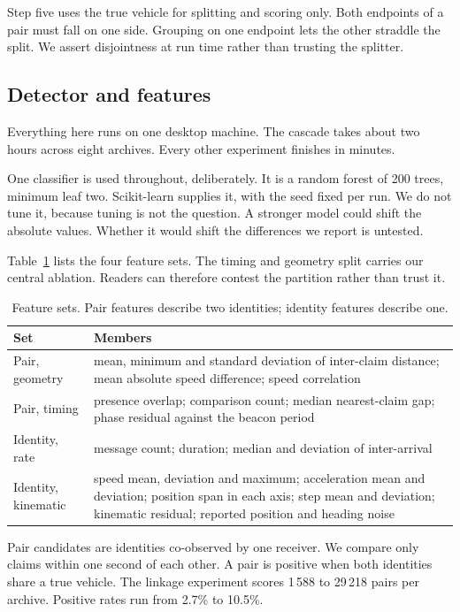 \documentclass[journal,twoside]{IEEEtran}
\begin{document}
Step five uses the true vehicle for splitting and scoring only.
Both endpoints of a pair must fall on one side.
Grouping on one endpoint lets the other straddle the split.
We assert disjointness at run time rather than trusting the splitter.

\subsection{Detector and features}

Everything here runs on one desktop machine.
The cascade takes about two hours across eight archives.
Every other experiment finishes in minutes.

One classifier is used throughout, deliberately.
It is a random forest of 200 trees, minimum leaf two.
Scikit-learn supplies it, with the seed fixed per run.
We do not tune it, because tuning is not the question.
A stronger model could shift the absolute values.
Whether it would shift the differences we report is untested.

Table~\ref{tab:features} lists the four feature sets.
The timing and geometry split carries our central ablation.
Readers can therefore contest the partition rather than trust it.

\begin{table}[t]
\caption{Feature sets. Pair features describe two identities;
identity features describe one.}
\label{tab:features}
\centering
\footnotesize
\begin{tabular}{@{}>{\raggedright\arraybackslash}p{1.35cm}>{\raggedright\arraybackslash}p{6.1cm}@{}}
\toprule
Set & Members \\
\midrule
Pair, geometry & mean, minimum and standard deviation of inter-claim distance;
mean absolute speed difference; speed correlation \\
Pair, timing & presence overlap; comparison count; median nearest-claim gap;
phase residual against the beacon period \\
Identity, rate & message count; duration; median and deviation of inter-arrival \\
Identity, kinematic & speed mean, deviation and maximum; acceleration mean and
deviation; position span in each axis; step mean and deviation; kinematic
residual; reported position and heading noise \\
\bottomrule
\end{tabular}
\end{table}

Pair candidates are identities co-observed by one receiver.
We compare only claims within one second of each other.
A pair is positive when both identities share a true vehicle.
The linkage experiment scores 1\,588 to 29\,218 pairs per archive.
Positive rates run from 2.7\% to 10.5\%.
\end{document}
